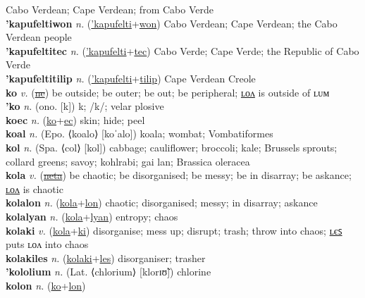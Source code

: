 Cabo Verdean; Cape Verdean; from Cabo Verde \label{'kapufeltiak} \\
\textbf{'kapufeltiwon} \textit{n.} (\hyperref['kapufelti]{'kapufelti}+\hyperref[won]{won})
Cabo Verdean; Cape Verdean; the Cabo Verdean people \label{'kapufeltiwon} \\
\textbf{'kapufeltitec} \textit{n.} (\hyperref['kapufelti]{'kapufelti}+\hyperref[tec]{tec})
Cabo Verde; Cape Verde; the Republic of Cabo Verde \label{'kapufeltitec} \\
\textbf{'kapufeltitilip} \textit{n.} (\hyperref['kapufelti]{'kapufelti}+\hyperref[tilip]{tilip})
Cape Verdean Creole \label{'kapufeltitilip} \\
\textbf{ko} \textit{v.} (\hyperref[ne]{\sout{ne}})
be outside; be outer; be out; be peripheral; \hyperref[kolon]{ʟᴏᴧ} is outside of ʟᴜᴍ \label{ko} \\
\textbf{'ko} \textit{n.} (ono. [k])
k; /k/; velar plosive \label{'ko} \\
\textbf{koec} \textit{n.} (\hyperref[ko]{ko}+\hyperref[ec]{ec})
skin; hide; peel \label{koec} \\
\textbf{koal} \textit{n.} (Epo. ⟨koalo⟩ [koˈalo])
koala; wombat; Vombatiformes \label{koal} \\
\textbf{kol} \textit{n.} (Spa. ⟨col⟩ [kol])
cabbage; cauliflower; broccoli; kale; Brussels sprouts; collard greens; savoy; kohlrabi; gai lan; Brassica oleracea \label{kol} \\
\textbf{kola} \textit{v.} (\hyperref[neta]{\sout{neta}})
be chaotic; be disorganised; be messy; be in disarray; be askance; \hyperref[kolalon]{ʟᴏᴧ} is chaotic \label{kola} \\
\textbf{kolalon} \textit{n.} (\hyperref[kola]{kola}+\hyperref[lon]{lon})
chaotic; disorganised; messy; in disarray; askance \label{kolalon} \\
\textbf{kolalyan} \textit{n.} (\hyperref[kola]{kola}+\hyperref[lyan]{lyan})
entropy; chaos \label{kolalyan} \\
\textbf{kolaki} \textit{v.} (\hyperref[kola]{kola}+\hyperref[ki]{ki})
disorganise; mess up; disrupt; trash; throw into chaos; \hyperref[kolakiles]{ʟєꜱ} puts ʟᴏᴧ into chaos \label{kolaki} \\
\textbf{kolakiles} \textit{n.} (\hyperref[kolaki]{kolaki}+\hyperref[les]{les})
disorganiser; trasher \label{kolakiles} \\
\textbf{'kololium} \textit{n.} (Lat. ⟨chlorium⟩ [klorɪʊ̃])
chlorine \label{'kololium} \\
\textbf{kolon} \textit{n.} (\hyperref[ko]{ko}+\hyperref[lon]{lon})
